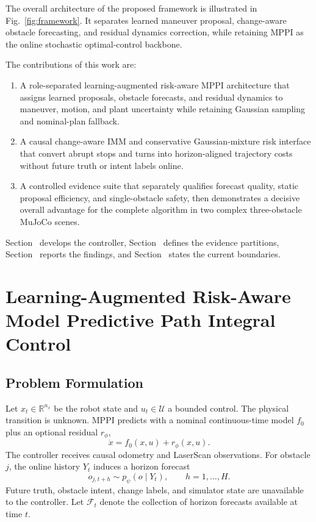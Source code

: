 \documentclass[conference]{IEEEtran}
\newcommand{\reviewbox}[2]{%
    \begingroup
    \setlength{\fboxsep}{0.35pt}%
    \setlength{\fboxrule}{0.45pt}%
    \hyperref[#1]{\fcolorbox{red}{white}{\vphantom{I}#2}}%
    \endgroup}
\newcommand{\reviewref}[1]{\reviewbox{#1}{\ref*{#1}}}
\newcommand{\reviewref}[1]{\ref{#1}}
\begin{document}
The overall architecture of the proposed framework is illustrated in
Fig.~\ref{fig:framework}. It separates learned maneuver proposal,
change-aware obstacle forecasting, and residual dynamics correction,
while retaining MPPI as the online stochastic optimal-control backbone.

The contributions of this work are:

\begin{enumerate}
    \item A role-separated learning-augmented risk-aware MPPI architecture that assigns learned proposals, obstacle forecasts, and residual dynamics to maneuver, motion, and plant uncertainty while retaining Gaussian sampling and nominal-plan fallback.
    \item A causal change-aware IMM and conservative Gaussian-mixture risk interface that convert abrupt stops and turns into horizon-aligned trajectory costs without future truth or intent labels online.
    \item A controlled evidence suite that separately qualifies forecast quality, static proposal efficiency, and single-obstacle safety, then demonstrates a decisive overall advantage for the complete algorithm in two complex three-obstacle MuJoCo scenes.
\end{enumerate}

Section~\reviewref{sec:method} develops the controller, Section~\reviewref{sec:protocol} defines the evidence partitions, Section~\reviewref{sec:results} reports the findings, and Section~\reviewref{sec:limitations} states the current boundaries.



\section{Learning-Augmented Risk-Aware Model Predictive Path Integral Control}
\label{sec:method}

\subsection{Problem Formulation}

Let $x_t\in\mathbb{R}^{n_x}$ be the robot state and $u_t\in\mathcal{U}$ a bounded control. The physical transition is unknown. MPPI predicts with a nominal continuous-time model $f_0$ plus an optional residual $r_\phi$,
\begin{equation}
    \dot{x}=f_0(x,u)+r_\phi(x,u).
    \label{eq:dynamics}
\end{equation}
The controller receives causal odometry and LaserScan observations. For obstacle $j$, the online history $Y_t$ induces a horizon forecast
\begin{equation}
    o_{j,t+h}\sim p_\psi(o\mid Y_t),\qquad h=1,\ldots,H.
    \label{eq:forecast}
\end{equation}
Future truth, obstacle intent, change labels, and simulator state are unavailable to the controller. Let $\mathcal{F}_t$ denote the collection of horizon forecasts available at time $t$.
\end{document}

